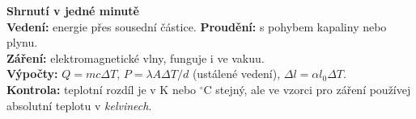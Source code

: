 \documentclass[11pt,a4paper]{article}
\newif\ifshowanswers
\newcommand{\unit}[1]{\,\mathrm{#1}}
\begin{document}
\ifshowanswers
\section{Výsledky a odůvodnění}
\begin{enumerate}
\item \textbf{Vedení.} Energie postupuje materiálem bez proudění kovu jako celku.
\item \textbf{Přirozená konvekce.} Zahřátý vzduch má při přibližně stejném tlaku menší hustotu a působením vztlaku stoupá; chladnější jej nahrazuje.
\item \textbf{Elektromagnetickým zářením.} Vakuum neobsahuje látkové prostředí potřebné pro vedení nebo proudění.
\item $\Delta T=20\unit K$;
\[
Q=0{,}5\cdot4200\cdot20=\boxed{42\,000\unit J=42\unit{kJ}}.
\]
\item \textbf{$10\unit W$.} V jednoduchém modelu je $P$ nepřímo úměrný tloušťce $d$.
\item
\[
\Delta l=20\cdot10^{-6}\cdot1{,}5\cdot40
 =0{,}0012\unit m=\boxed{1{,}2\unit{mm}}.
\]
\item \textbf{$2^4=16$krát.} Ve Stefanově--Boltzmannově zákoně je $T^4$, nikoli $T^2$. Nelze ale bez dalšího tvrdit, že stejně roste \emph{čistý} tok energie do okolí.
\item \textbf{Teplo} označuje energii \emph{přenášenou} mezi soustavami kvůli rozdílu teplot; energetický stav soustavy popisuje mimo jiné její \textbf{vnitřní energie} $U$.
\end{enumerate}
\fi

\begin{theorybox}
\textbf{Shrnutí v jedné minutě}\\
\textbf{Vedení:} energie přes sousední částice. \quad
\textbf{Proudění:} s pohybem kapaliny nebo plynu.\\
\textbf{Záření:} elektromagnetické vlny, funguje i ve vakuu.\\
\textbf{Výpočty:} $Q=mc\Delta T$, $P=\lambda A\Delta T/d$ (ustálené vedení),
$\Delta l=\alpha l_0\Delta T$.\\
\textbf{Kontrola:} teplotní rozdíl je v K nebo $^\circ$C stejný, ale ve vzorci pro záření používej absolutní teplotu v \emph{kelvinech}.
\end{theorybox}
\end{document}
